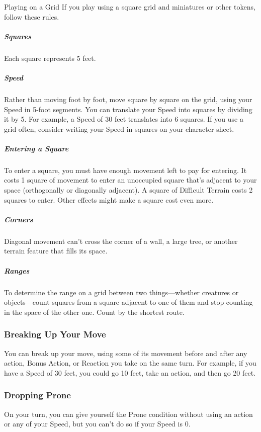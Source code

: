 \documentclass[10pt,a4paper,twoside,bg=print,twocolumn,openany,nodeprecatedcode]{dndbook}
\begin{document}
\begin{DndSidebar}[float=!b]{Playing on a Grid}
If you play using a square grid and miniatures or other tokens, follow these rules.



\subparagraph{Squares}
Each square represents 5 feet.



\subparagraph{Speed}
Rather than moving foot by foot, move square by square on the grid, using your Speed in 5-foot segments. You can translate your Speed into squares by dividing it by 5. For example, a Speed of 30 feet translates into 6 squares. If you use a grid often, consider writing your Speed in squares on your character sheet.



\subparagraph{Entering a Square}
To enter a square, you must have enough movement left to pay for entering. It costs 1 square of movement to enter an unoccupied square that's adjacent to your space (orthogonally or diagonally adjacent). A square of Difficult Terrain costs 2 squares to enter. Other effects might make a square cost even more.



\subparagraph{Corners}
Diagonal movement can't cross the corner of a wall, a large tree, or another terrain feature that fills its space.



\subparagraph{Ranges}
To determine the range on a grid between two things—whether creatures or objects—count squares from a square adjacent to one of them and stop counting in the space of the other one. Count by the shortest route.



\end{DndSidebar}

\subsubsection{Breaking Up Your Move}
You can break up your move, using some of its movement before and after any action, Bonus Action, or Reaction you take on the same turn. For example, if you have a Speed of 30 feet, you could go 10 feet, take an action, and then go 20 feet.

\subsubsection{Dropping Prone}
On your turn, you can give yourself the Prone condition without using an action or any of your Speed, but you can't do so if your Speed is 0.
\end{document}
